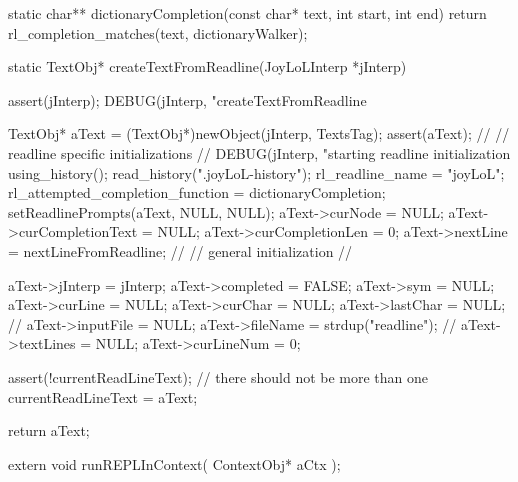 static char** dictionaryCompletion(const char* text, int start, int end) {
 return rl_completion_matches(text, dictionaryWalker);
}
\stopCCode

\startCCode
static TextObj* createTextFromReadline(JoyLoLInterp *jInterp) {
  
  assert(jInterp);
  DEBUG(jInterp, "createTextFromReadline %
  
  TextObj* aText = (TextObj*)newObject(jInterp, TextsTag);
  assert(aText);
  //
  // readline specific initializations
  //
  DEBUG(jInterp, "starting readline initialization %
  using_history();
  read_history(".joyLoL-history");
  rl_readline_name = "joyLoL";
  rl_attempted_completion_function = dictionaryCompletion;
  setReadlinePrompts(aText, NULL, NULL);
  aText->curNode = NULL;
  aText->curCompletionText = NULL;
  aText->curCompletionLen  = 0;
  aText->nextLine = nextLineFromReadline;
  //
  // general initialization
  //

  aText->jInterp    = jInterp;
  aText->completed  = FALSE;
  aText->sym        = NULL;
  aText->curLine    = NULL;
  aText->curChar    = NULL;
  aText->lastChar   = NULL;
  //
  aText->inputFile = NULL;
  aText->fileName  = strdup("readline");
  //
  aText->textLines  = NULL;
  aText->curLineNum = 0;

  assert(!currentReadLineText); // there should not be more than one
  currentReadLineText = aText;

  return aText;
}
\stopCCode

\startCHeader
extern void runREPLInContext(
  ContextObj* aCtx
);
\stopCHeader

